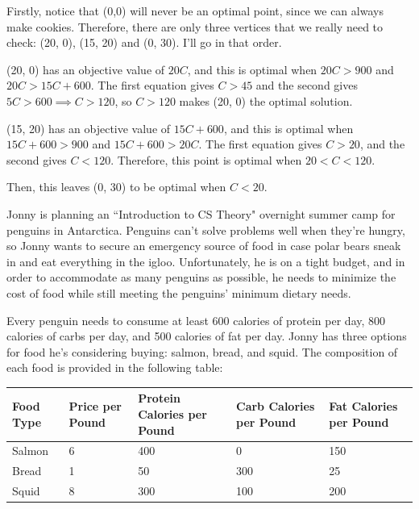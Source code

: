 \documentclass[11pt]{article}
\begin{document}
\begin{subparts}
\begin{solution}
	Firstly, notice that (0,0) will never be an optimal point, since we can always make cookies. 
	Therefore, there are only three vertices that we 
	really need to check: (20, 0), (15, 20) and (0, 30). I'll go in that order. 
	
	(20, 0) has an objective value of \(20C\), and this is optimal when \(20C > 900\) and \(20C > 15C + 600\).
	The first equation gives  \(C > 45\) and the second gives \(5C > 600 \implies C > 120\), so 
	\(C > 120\) makes (20, 0) the optimal solution. 

	(15, 20) has an objective value of \(15C + 600\), and this is optimal when \(15C + 600 > 900\) and 
	\(15 C + 600 > 20C\). The first equation gives \(C > 20\), and the second gives \(C < 120\). Therefore, 
	this point is optimal when \(20 < C < 120\). 
	
	Then, this leaves (0, 30) to be optimal when \(C < 20\). 
\end{solution}
\end{subparts}

\newpage


Jonny is planning an ``Introduction to CS Theory" overnight summer camp for penguins in Antarctica. Penguins can't solve problems well when they're hungry, so Jonny wants to secure an emergency source of food in case polar bears sneak in and eat everything in the igloo. Unfortunately, he is on a tight budget, and in order to accommodate as many penguins as possible, he needs to minimize the cost of food while still meeting the penguins' minimum dietary needs.

\noindent Every penguin needs to consume at least 600 calories of protein per day, 800 calories of carbs per day, and 500 calories of fat per day. Jonny has three options for food he's considering buying: salmon, bread, and squid. The composition of each food is provided in the following table:

\begin{center}
    \begin{tabular}{|m{6em}|m{5em}|m{8.4em}|m{7em}|m{6.2em}|}
        \hline
         \textbf{Food Type} & \textbf{Price per Pound} & \textbf{Protein Calories per Pound} & \textbf{Carb Calories per Pound} & \textbf{Fat Calories per Pound} \\
         \hline
         Salmon & 6 & 400 & 0 & 150\\
         \hline
         Bread & 1 & 50 & 300 & 25\\
         \hline
         Squid & 8 & 300 & 100 & 200\\
         \hline
    \end{tabular}
\end{center}
\end{document}
